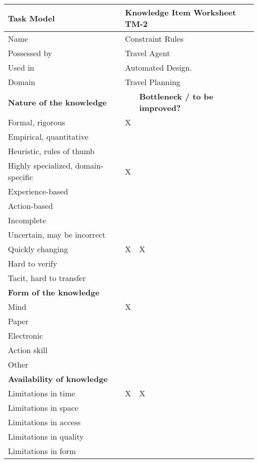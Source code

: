 
\begin{tabular}%
       {|p{3cm}%
        |p{2cm}%
        |p{4.2cm}|}
\hline
{\bf Task Model} &
\multicolumn{2}{|l|}{ {\bf Knowledge Item Worksheet TM-2} } \\
\hline
\hline
\sc Name & \multicolumn{2}{|l|}{{\rm Constraint Rules} } \\
\sc Possessed by & \multicolumn{2}{|l|}{{\rm Travel Agent} } \\
\sc Used in & \multicolumn{2}{|l|}{{\rm Automated Design.} } \\
\sc Domain & \multicolumn{2}{|l|}{{\rm Travel Planning}}\\
\hline
\hline
\multicolumn{2}{|l|}{ {\bf Nature of the knowledge} }
 & {\bf Bottleneck / to be improved?} \\
\hline
Formal, rigorous & X & \\
\hline
Empirical, quantitative & &\\
\hline
Heuristic, rules of thumb & & \\
\hline
Highly specialized, domain-specific & X & \\
\hline
Experience-based & & \\
\hline
Action-based & & \\
\hline
Incomplete  & & \\
\hline
Uncertain, may be incorrect & &\\
\hline
Quickly changing & X & X\\
\hline
Hard to verify & &\\
\hline
Tacit, hard to transfer & &\\
\hline
\hline
\multicolumn{3}{|l|}{ {\bf Form of the knowledge} } \\
\hline
Mind & X & \\
\hline
Paper & & \\
\hline
Electronic & & \\
\hline
Action skill & & \\
\hline
Other & & \\
\hline
\hline
\multicolumn{3}{|l|}{ {\bf Availability of knowledge} } \\
\hline
Limitations in time  & X & X\\
\hline
Limitations in space & & \\
\hline
Limitations in access & & \\
\hline
Limitations in quality & &\\
\hline
Limitations in form & & \\
\hline
\end{tabular}

